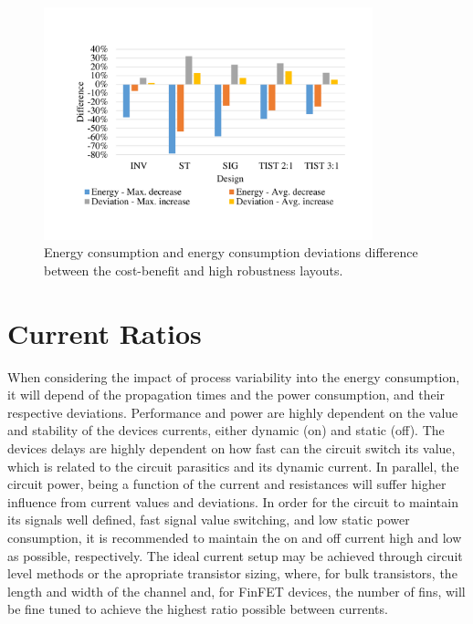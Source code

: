 \documentclass[diss,pgmicro,english]{iiufrgs}
\begin{document}
\begin{figure}[H]
	\centering
        \caption{Energy consumption and energy consumption deviations difference between the cost-benefit and high robustness layouts. \label{CBCompHR}}
      	\includegraphics[width=0.85\textwidth, trim={1.25cm 2cm 2cm 3cm}, clip]{compCB-HR.pdf}
\end{figure}


\section{Current Ratios}




    When considering the impact of process variability into the energy consumption, it will depend of the propagation times and the power consumption, and their respective deviations. Performance and power are highly dependent on the value and stability of the devices currents, either dynamic (on) and static (off). The devices delays are highly dependent on how fast can the circuit switch its value, which is related to the circuit parasitics and its dynamic current. In parallel, the circuit power, being a function of the current and resistances will suffer higher influence from current values and deviations. In order for the circuit to maintain its signals well defined, fast signal value switching, and low static power consumption, it is recommended to maintain the on and off current high and low as possible, respectively. The ideal current setup may be achieved through circuit level methods or the apropriate transistor sizing, where, for bulk transistors, the length and width of the channel and, for FinFET devices, the number of fins, will be fine tuned to achieve the highest ratio possible between currents.
\end{document}
